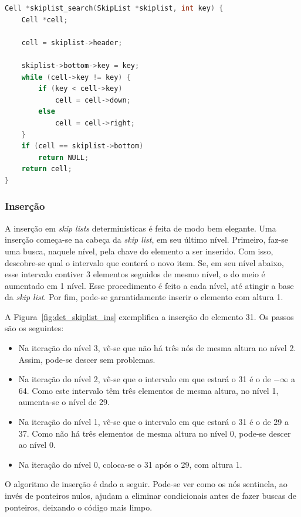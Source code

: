 \documentclass[paper=a4, fontsize=11pt]{scrartcl} %
\numberwithin{equation}{section}
\numberwithin{figure}{section}
\numberwithin{table}{section}
\numberwithin{definition}{section}
\numberwithin{theorem}{section}
\numberwithin{property}{section}
\numberwithin{proposition}{section}
\newcommand{\sls}{\textit{skip lists}\xspace}
\renewcommand{\sl}{\textit{skip list}\xspace}
\begin{document}
\begin{lstlisting}[caption=Algortimo de busca para Skip Lists determinísticas, language=C]
Cell *skiplist_search(SkipList *skiplist, int key) {
    Cell *cell;

    cell = skiplist->header;

    skiplist->bottom->key = key;
    while (cell->key != key) {
        if (key < cell->key)
            cell = cell->down;
        else
            cell = cell->right;
    }
    if (cell == skiplist->bottom)
        return NULL;
    return cell;
}
\end{lstlisting}

\subsubsection{Inserção}

A inserção em \sls determinísticas é feita de modo bem elegante. Uma inserção 
começa-se na cabeça da \sl, em seu último nível. Primeiro, faz-se uma busca, naquele nível, pela chave do elemento
a ser inserido. Com isso, descobre-se qual o intervalo que conterá o novo item. Se, em seu nível abaixo,
esse intervalo contiver 3 elementos seguidos de mesmo nível, o do meio é aumentado em 1 nível.
Esse procedimento é feito a cada nível, até atingir a base da \sl. Por fim, pode-se garantidamente
inserir o elemento com altura 1.

A Figura~\ref{fig:det_skiplist_ins} exemplifica a inserção do elemento 31. Os passos são os seguintes:
\begin{itemize}
  \item Na iteração do nível 3, vê-se que não há três nós de mesma altura no nível 2. Assim, pode-se descer
  sem problemas.
  \item Na iteração do nível 2, vê-se que o intervalo em que estará o 31 é o de $-\infty$ a 64. Como este
  intervalo têm três elementos de mesma altura, no nível 1, aumenta-se o nível de 29.
  \item Na iteração do nível 1, vê-se que o intervalo em que estará o 31 é o de 29 a 37. Como não
  há três elementos de mesma altura no nível 0, pode-se descer ao nível 0.
  \item Na iteração do nível 0, coloca-se o 31 após o 29, com altura 1.
\end{itemize}

O algoritmo de inserção é dado a seguir. Pode-se ver como os nós sentinela, ao invés de ponteiros
nulos, ajudam a eliminar condicionais antes de fazer buscas de ponteiros, deixando o código mais limpo.
\end{document}
